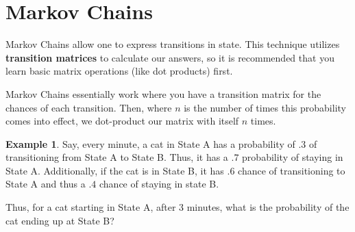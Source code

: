 \documentclass[letterpaper]{article}
\theoremstyle{definition}
\newtheorem{example}[thm]{Example}
\theoremstyle{remark}
\theoremstyle{definition}
\begin{document}
\section{Markov Chains}
Markov Chains allow one to express transitions in state. This technique utilizes \textbf{transition matrices} to calculate our answers, so it is recommended that you learn basic matrix operations (like dot products) first.

Markov Chains essentially work where you have a transition matrix for the chances of each transition. Then, where $n$ is the number of times this probability comes into effect, we dot-product our matrix with itself $n$ times.

\begin{example}
Say, every minute, a cat in State A has a probability of $.3$ of transitioning from State A to State B. Thus, it has a $.7$ probability of staying in State A. Additionally, if the cat is in State B, it has $.6$ chance of transitioning to State A and thus a $.4$ chance of staying in state B.
\begin{center}
\end{center}

\noindent
Thus, for a cat starting in State A, after 3 minutes, what is the probability of the cat ending up at State B? 
\end{example}
\end{document}
